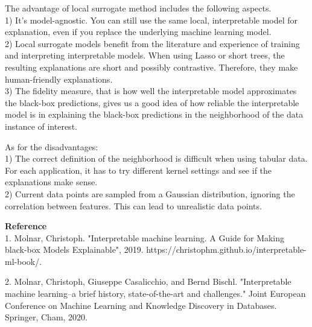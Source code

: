 \documentclass{article}
\begin{document}
The advantage of local surrogate method includes the following aspects. \\
1) It's model-agnostic. You can still use the same local, interpretable model for explanation, even if you replace the underlying machine learning model.\\ 
2) Local surrogate models benefit from the literature and experience of training and interpreting interpretable models. When using Lasso or short trees, the resulting explanations are short and possibly contrastive. Therefore, they make human-friendly explanations. \\
3) The fidelity measure, that is how well the interpretable model approximates the black-box predictions, gives us a good idea of how reliable the interpretable model is in explaining the black-box predictions in the neighborhood of the data instance of interest.

As for the disadvantages: \\
1) The correct definition of the neighborhood is difficult when using tabular data. For each application, it has to try different kernel settings and see if the explanations make sense. \\
2) Current data points are sampled from a Gaussian distribution, ignoring the correlation between features. This can lead to unrealistic data points.


\vspace{1cm}
\textbf{Reference}\\
1. Molnar, Christoph. "Interpretable machine learning. A Guide for Making black-box Models Explainable", 2019. https://christophm.github.io/interpretable-ml-book/.

2. Molnar, Christoph, Giuseppe Casalicchio, and Bernd Bischl. "Interpretable machine learning–a brief history, state-of-the-art and challenges." Joint European Conference on Machine Learning and Knowledge Discovery in Databases. Springer, Cham, 2020.
\end{document}
